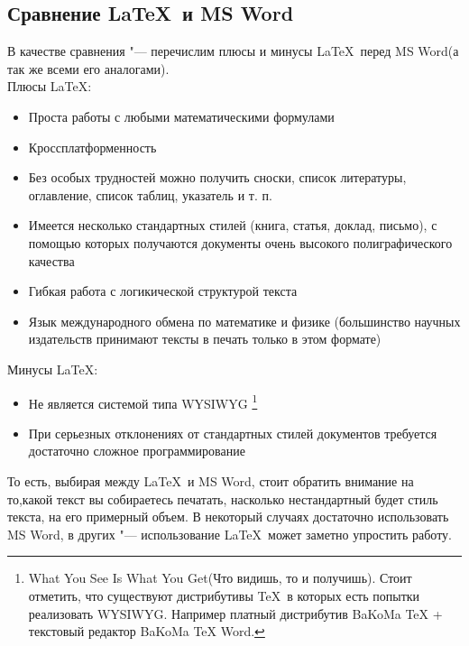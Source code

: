 \documentclass{article}
\begin{document}
		\subsection{Сравнение \LaTeX ~и MS Word}
			В качестве сравнения "--- перечислим плюсы и минусы \LaTeX ~перед MS Word(а так же всеми его аналогами). \\	
	    Плюсы \LaTeX: 
	    \begin{itemize} 
	    	\item	Проста работы с любыми математическими формулами
	    	\item	Кроссплатформенность 
	    	\item	Без особых трудностей можно получить сноски, список литературы,
					оглавление, список таблиц, указатель и т. п.
	    	\item	Имеется несколько стандартных стилей (книга, статья, доклад,
					письмо), с помощью которых получаются документы очень высокого
					полиграфического качества 
	    	\item	Гибкая работа с логикической структурой текста
	    	\item	Язык международного обмена по математике и физике (большинство     
   					научных издательств принимают тексты в печать  только в этом формате)
    	\end{itemize}
    	\newpage
    	Минусы \LaTeX:
		\begin{itemize} 
	    	\item	Не является системой типа WYSIWYG
	    				\footnote{What You See Is What You Get(Что видишь, то и получишь). Стоит отметить, что существуют 									дистрибутивы \TeX ~в которых есть попытки реализовать WYSIWYG. Например платный дистрибутив  BaKoMa TeX + 						текстовый редактор  BaKoMa TeX Word.}   
	    	\item	При серьезных отклонениях от стандартных стилей документов требуется
					достаточно сложное программирование	
    	\end{itemize}
    	
    		То есть, выбирая между \LaTeX ~и MS Word, стоит обратить внимание на то,какой текст вы собираетесь печатать, 					насколько нестандартный будет стиль текста, на его примерный объем. В некоторый случаях достаточно использовать MS Word,   		в других "--- использование \LaTeX ~может заметно упростить работу.
\end{document}
